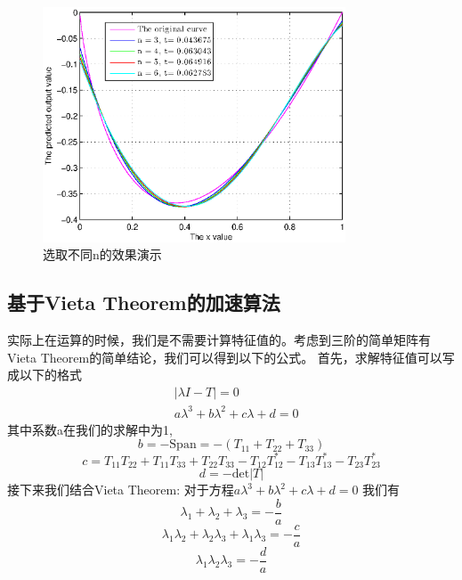\documentclass{article}
\begin{document}
\begin{figure}[h!]
\centering
\includegraphics[width=9cm]{fig1.eps}
\caption{选取不同n的效果演示}
\end{figure}
\subsection{基于Vieta Theorem的加速算法}
实际上在运算的时候，我们是不需要计算特征值的。考虑到三阶的简单矩阵有Vieta Theorem的简单结论，我们可以得到以下的公式。
首先，求解特征值可以写成以下的格式
\begin{equation}
\begin{aligned}
&|\lambda I - T| = 0 \\
&a\lambda^3 + b\lambda^2 + c\lambda + d = 0
\end{aligned}
\end{equation}
其中系数a在我们的求解中为1,
\begin{equation}
b = -\mbox{Span} = - (T_{11} + T_{22} + T_{33})
\end{equation}
\begin{equation}
c = T_{11} T_{22} +T_{11}T_{33} + T_{22}T_{33} - T_{12}T_{12}^*
- T_{13}T_{13}^*- T_{23}T_{23}^*
\end{equation}
\begin{equation}
d = -\mbox{det}|T|
\end{equation}
接下来我们结合Vieta Theorem:
对于方程\(a\lambda^3 + b\lambda^2 + c\lambda + d = 0\)
我们有
\begin{equation}
\lambda_1 + \lambda_2 + \lambda_3 = -\frac{b}{a}
\end{equation}
\begin{equation}
\lambda_1\lambda_2 + \lambda_2\lambda_3 +\lambda_1 \lambda_3 = -\frac{c}{a}
\end{equation}
\begin{equation}
\lambda_1\lambda_2\lambda_3 = -\frac{d}{a}
\end{equation}
\end{document}
